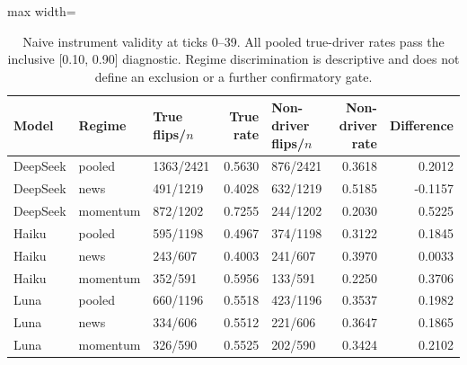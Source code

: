 \begin{table}[tbp]
\caption{Naive instrument validity at ticks 0--39. All pooled true-driver rates pass the inclusive [0.10, 0.90] diagnostic. Regime discrimination is descriptive and does not define an exclusion or a further confirmatory gate.}
\label{tab:validity}
\centering\footnotesize
\setlength{\tabcolsep}{4pt}
\begin{adjustbox}{max width=\linewidth}
\begin{tabular}{lllrlrr}
\toprule
Model & Regime & True flips/$n$ & True rate & Non-driver flips/$n$ & Non-driver rate & Difference \\
\midrule
DeepSeek & pooled & 1363/2421 & 0.5630 & 876/2421 & 0.3618 & 0.2012 \\
DeepSeek & news & 491/1219 & 0.4028 & 632/1219 & 0.5185 & -0.1157 \\
DeepSeek & momentum & 872/1202 & 0.7255 & 244/1202 & 0.2030 & 0.5225 \\
Haiku & pooled & 595/1198 & 0.4967 & 374/1198 & 0.3122 & 0.1845 \\
Haiku & news & 243/607 & 0.4003 & 241/607 & 0.3970 & 0.0033 \\
Haiku & momentum & 352/591 & 0.5956 & 133/591 & 0.2250 & 0.3706 \\
Luna & pooled & 660/1196 & 0.5518 & 423/1196 & 0.3537 & 0.1982 \\
Luna & news & 334/606 & 0.5512 & 221/606 & 0.3647 & 0.1865 \\
Luna & momentum & 326/590 & 0.5525 & 202/590 & 0.3424 & 0.2102 \\
\bottomrule
\end{tabular}
\end{adjustbox}
\end{table}
